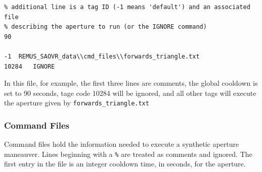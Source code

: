 \documentclass[11pt]{article} %
\begin{document}
\begin{Verbatim}[xleftmargin=.5in,fontsize=\small,frame=single]
% First line of this file is the global cooldown time in seconds, then each
% additional line is a tag ID (-1 means 'default') and an associated file
% describing the aperture to run (or the IGNORE command)
90

-1	REMUS_SAOVR_data\\cmd_files\\forwards_triangle.txt
10284	IGNORE
\end{Verbatim}

In this file, for example, the first three lines are comments, the global cooldown is set to 90 seconds, tage code 10284 will be ignored, and all other tags
will execute the aperture given by \mbox{\texttt{forwards\_triangle.txt}}

\subsubsection*{Command Files}

Command files hold the information needed to execute a synthetic aperture maneauver. Lines beginning with a \texttt{\%} are treated as comments
and ignored. The first entry in the file is an integer cooldown time, in seconds, for the aperture. 
\end{document}
